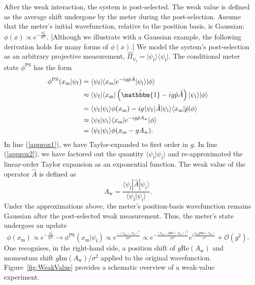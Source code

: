\documentclass[%
 reprint,
superscriptaddress,
nofootinbib,
bibnotes,
 amsmath,amssymb,
 aps,
]{revtex4-1}
\theoremstyle{plain}
\newcommand*{\ketbra}[2]{\lvert #1 \rangle\!\langle #2 \rvert}
\renewcommand{\Re}[1]{\mathrm{Re}\left(#1\right)}
\renewcommand{\Im}[1]{\mathrm{Im}#1}
\def\la{\langle}
\def\ra{\rangle}
\def\be{\begin{equation}}
\def\ee{\end{equation}}
\begin{document}
After the weak interaction, the system is post-selected.
The weak value is defined as the 
average shift undergone by the meter during the post-selection.  Assume that the meter's initial wavefunction, relative to the position basis,
is Gaussian: $\phi(x) \propto e^{-\frac{x_{\mathrm{m}}^2}{2\sigma^2}} $. [Although we illustrate with a Gaussian example, the following derivation holds for many forms of $\phi(x)$.]
We model the system's post-selection as an arbitrary projective measurement, 
${\hat \Pi}_{\psi_{\mathrm{f}}} 
= \ketbra{\psi_{\mathrm{f}}}{\psi_{\mathrm{f}}}$. 
The conditional meter state $\phi^{\mathrm{PS}}$ has the form
\begin{align}
\phi^{\mathrm{PS}}(x_{\mathrm{m}}|\psi_{\mathrm{f}}) &= \la \psi_{\mathrm{f}} |\la x_{\mathrm{m}} |e^{-i g {\hat p}{\hat A}} |\psi_{\mathrm{i}}\ra |\phi\ra  \nonumber \\
&\approx \la \psi_{\mathrm{f}} |\la x_{\mathrm{m}} |
 \left( \hat{\mathbbm{1}} - i g {\hat p}{\hat A} \right)  
|\psi_{\mathrm{i}}\ra |\phi\ra   \label{approx1}\\
&= \la \psi_{\mathrm{f}} |\psi_{\mathrm{i}}\ra \phi(x_{\mathrm{m}}) -i g \la \psi_{\mathrm{f}} |{\hat A}| \psi_{\mathrm{i}}\ra \la x_{\mathrm{m}} | {\hat p}| \phi\ra \nonumber \\
&\approx \la \psi_{\mathrm{f}} |\psi_{\mathrm{i}}\ra \la x_{\mathrm{m}}| e^{-i g {\hat p} A_{\mathrm{w}}} |\phi\ra \label{approx2}\\
&= \la \psi_{\mathrm{f}} |\psi_{\mathrm{i}}\ra \phi(x_{\mathrm{m}} - g A_{\mathrm{w}}).~\nonumber
\end{align}
In line (\ref{approx1}), we have Taylor-expanded to first order in $g$.  In line (\ref{approx2}), we have factored out the quantity $\la \psi_{\mathrm{f}} |\psi_{\mathrm{i}}\ra$ and re-approximated the linear-order Taylor expansion as an exponential function.  The weak value of the operator $\hat{A}$ is defined as 
\be
A_{\mathrm{w}} = \frac{\la \psi_{\mathrm{f}} |{\hat A} | \psi_{\mathrm{i}}\ra}{\la \psi_{\mathrm{f}} |\psi_{\mathrm{i}}\ra}.  \label{wv}
\ee
Under the approximations above, the meter's position-basis wavefunction
remains Gaussian 
after the post-selected weak measurement. Thus, the meter's state undergoes an update
\begin{equation}
    \phi(x_{\mathrm{m}}) \propto e^{-\frac{x_{\mathrm{m}}^2}{2\sigma^2}} \rightarrow \phi^{\mathrm{PS}}(x_{\mathrm{m}}|\psi_{\mathrm{f}}) \propto   e^{\frac{-(x_{\mathrm{m}}- A_{\mathrm{w}})^2}{2\sigma^2}} \propto   e^{-\frac{[x_{\mathrm{m}} - g\Re{A_{\mathrm{w}}}]^2}{2\sigma^2}}   e^{i \frac{x_{\mathrm{m}} g \Im{(A_{\mathrm{w}})}}{\sigma^2}} + \mathcal{O}(g^2) .
    \label{meter-final}
\end{equation}
One recognises, in the right-hand side, a position shift of  $g\Re{A_{\mathrm{w}}}$ and momentum shift $g \Im{(A_{\mathrm{w}})}/\sigma^2$ applied to the original wavefunction.  Figure~\ref{fig:WeakValue} provides a schematic overview of a weak-value experiment.
\end{document}
